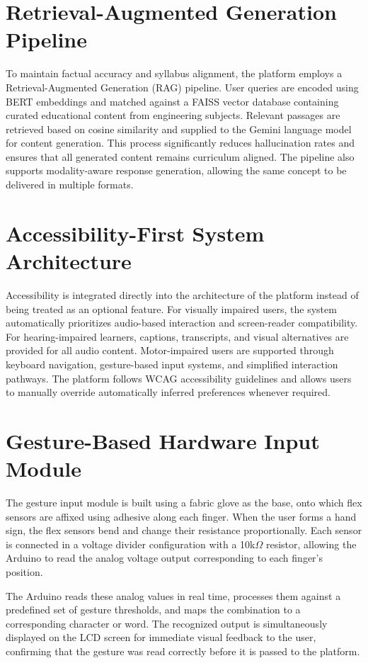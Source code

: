 \section{Retrieval-Augmented Generation Pipeline}
To maintain factual accuracy and syllabus alignment, the platform employs a Retrieval-Augmented Generation (RAG) pipeline. User queries are encoded using BERT embeddings and matched against a FAISS vector database containing curated educational content from engineering subjects. Relevant passages are retrieved based on cosine similarity and supplied to the Gemini language model for content generation. This process significantly reduces hallucination rates and ensures that all generated content remains curriculum aligned. The pipeline also supports modality-aware response generation, allowing the same concept to be delivered in multiple formats.

\section{Accessibility-First System Architecture}
Accessibility is integrated directly into the architecture of the platform instead of being treated as an optional feature. For visually impaired users, the system automatically prioritizes audio-based interaction and screen-reader compatibility. For hearing-impaired learners, captions, transcripts, and visual alternatives are provided for all audio content. Motor-impaired users are supported through keyboard navigation, gesture-based input systems, and simplified interaction pathways. The platform follows WCAG accessibility guidelines and allows users to manually override automatically inferred preferences whenever required.

\section{Gesture-Based Hardware Input Module}
The gesture input module is built using a fabric glove as the base, onto which flex sensors are affixed using adhesive along each finger. When the user forms a hand sign, the flex sensors bend and change their resistance proportionally. Each sensor is connected in a voltage divider configuration with a 10k$\Omega$ resistor, allowing the Arduino to read the analog voltage output corresponding to each finger’s position.

The Arduino reads these analog values in real time, processes them against a predefined set of gesture thresholds, and maps the combination to a corresponding character or word. The recognized output is simultaneously displayed on the LCD screen for immediate visual feedback to the user, confirming that the gesture was read correctly before it is passed to the platform.

